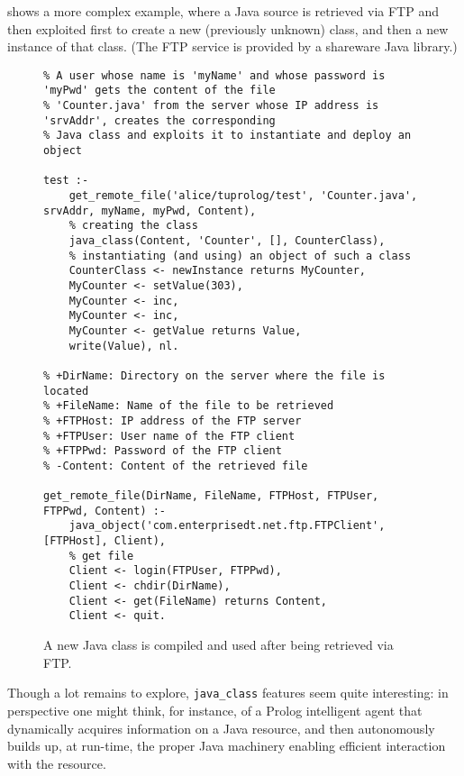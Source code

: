  shows a more complex example, where a Java source
is retrieved via FTP and then exploited first to create a new
(previously unknown) class, and then a new instance of that class.
(The FTP service is provided by a shareware Java library.)
%
\begin{figure}
\caption{A new Java class is compiled and used after being retrieved via FTP.
}
{\scriptsize
\begin{verbatim}
% A user whose name is 'myName' and whose password is 'myPwd' gets the content of the file
% 'Counter.java' from the server whose IP address is 'srvAddr', creates the corresponding
% Java class and exploits it to instantiate and deploy an object

test :-
    get_remote_file('alice/tuprolog/test', 'Counter.java', srvAddr, myName, myPwd, Content),
    % creating the class
    java_class(Content, 'Counter', [], CounterClass),
    % instantiating (and using) an object of such a class
    CounterClass <- newInstance returns MyCounter,
    MyCounter <- setValue(303),
    MyCounter <- inc,
    MyCounter <- inc,
    MyCounter <- getValue returns Value,
    write(Value), nl.

% +DirName: Directory on the server where the file is located
% +FileName: Name of the file to be retrieved
% +FTPHost: IP address of the FTP server
% +FTPUser: User name of the FTP client
% +FTPPwd: Password of the FTP client
% -Content: Content of the retrieved file

get_remote_file(DirName, FileName, FTPHost, FTPUser, FTPPwd, Content) :-
    java_object('com.enterprisedt.net.ftp.FTPClient', [FTPHost], Client),
    % get file
    Client <- login(FTPUser, FTPPwd),
    Client <- chdir(DirName),
    Client <- get(FileName) returns Content,
    Client <- quit.
\end{verbatim}
}
\end{figure}
%
Though a lot remains to explore, \texttt{java\_class} features
seem quite interesting: in perspective one might think, for
instance, of a Prolog intelligent agent that dynamically acquires
information on a Java resource, and then autonomously builds up,
at run-time, the proper Java machinery enabling efficient
interaction with the resource.
